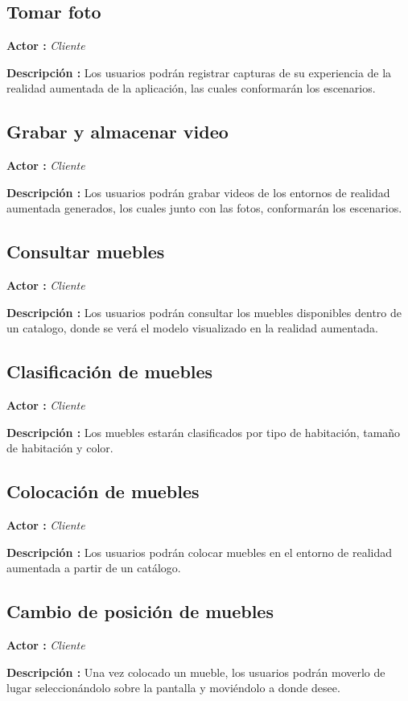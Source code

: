 \subsection{Tomar foto}
\textbf{Actor :} \textit{Cliente} \par
\textbf{Descripción :} Los usuarios podrán registrar capturas de su experiencia de la realidad aumentada de la aplicación, las cuales conformarán los escenarios.

\subsection{Grabar y almacenar video}
\textbf{Actor :} \textit{Cliente} \par
\textbf{Descripción :} Los usuarios podrán grabar videos de los entornos de realidad aumentada generados, los cuales junto con las fotos, conformarán los escenarios.


\subsection{Consultar muebles}
\textbf{Actor :} \textit{Cliente} \par
\textbf{Descripción :} Los usuarios podrán consultar los muebles disponibles dentro de un catalogo, donde se verá el modelo visualizado en la realidad aumentada.

\subsection{Clasificación de muebles}
\textbf{Actor :} \textit{Cliente} \par
\textbf{Descripción :} Los muebles estarán clasificados por tipo de habitación, tamaño de habitación y color.

\subsection{Colocación de muebles}
\textbf{Actor :} \textit{Cliente} \par
\textbf{Descripción :}  Los usuarios podrán colocar muebles en el entorno de realidad aumentada a partir de un catálogo.

\subsection{Cambio de posición de muebles}
\textbf{Actor :} \textit{Cliente} \par
\textbf{Descripción :}  Una vez colocado un mueble, los usuarios podrán moverlo de lugar seleccionándolo sobre la pantalla y moviéndolo a donde desee.


